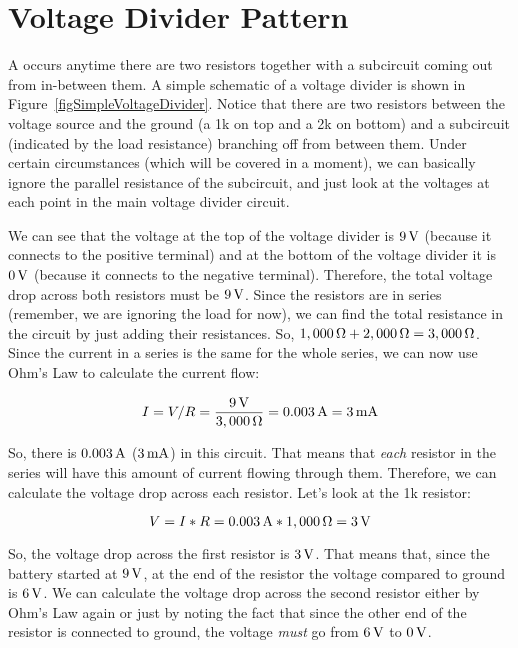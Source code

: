 \section{Voltage Divider Pattern}


A  occurs anytime there are two resistors together with a subcircuit coming out from in-between them.
A simple schematic of a voltage divider is shown in Figure~\ref{figSimpleVoltageDivider}.
Notice that there are two resistors between the voltage source and the ground (a 1k on top and a 2k on bottom) and a subcircuit (indicated by the load resistance) branching off from between them.
Under certain circumstances (which will be covered in a moment), we can basically ignore the parallel resistance of the subcircuit, and just look at the voltages at each point in the main voltage divider circuit.

We can see that the voltage at the top of the voltage divider is $9\,\si{\volt}$ (because it connects to the positive terminal) and at the bottom of the voltage divider it is $0\,\si{\volt}$ (because it connects to the negative terminal).  
Therefore, the total voltage drop across both resistors must be $9\,\si{\volt}$.
Since the resistors are in series (remember, we are ignoring the load for now), we can find the total resistance in the circuit by just adding their resistances.
So, $1,000\,\si{\ohm} + 2,000\,\si{\ohm} = 3,000\,\si{\ohm}$.
Since the current in a series is the same for the whole series, we can now use Ohm's Law to calculate the current flow:

$$ I = V / R = \frac{9\,\si{\volt}}{3,000\,\si{\ohm}} = 0.003\,\si{\ampere} = 3\,\si{\milli\ampere} $$

So, there is $0.003\,\si{\ampere}$ ($3\,\si{\milli\ampere}$) in this circuit.
That means that \emph{each} resistor in the series will have this amount of current flowing through them.
Therefore, we can calculate the voltage drop across each resistor.
Let's look at the 1k resistor:

$$ V = I * R = 0.003\,\si{\ampere} * 1,000\,\si{\ohm} = 3\,\si{\volt} $$

So, the voltage drop across the first resistor is $3\,\si{\volt}$.
That means that, since the battery started at $9\,\si{\volt}$, at the end of the resistor the voltage compared to ground is $6\,\si{\volt}$.
We can calculate the voltage drop across the second resistor either by Ohm's Law again or just by noting the fact that since the other end of the resistor is connected to ground, the voltage \emph{must} go from $6\,\si{\volt}$ to $0\,\si{\volt}$.

